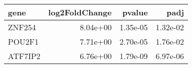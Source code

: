 \begin{tabular}{lrrr}
\toprule
   gene &  log2FoldChange &   pvalue &     padj \\
\midrule
 ZNF254 &        8.04e+00 & 1.35e-05 & 1.32e-02 \\
 POU2F1 &        7.71e+00 & 2.70e-05 & 1.76e-02 \\
ATF7IP2 &        6.76e+00 & 1.79e-09 & 6.97e-06 \\
\bottomrule
\end{tabular}
